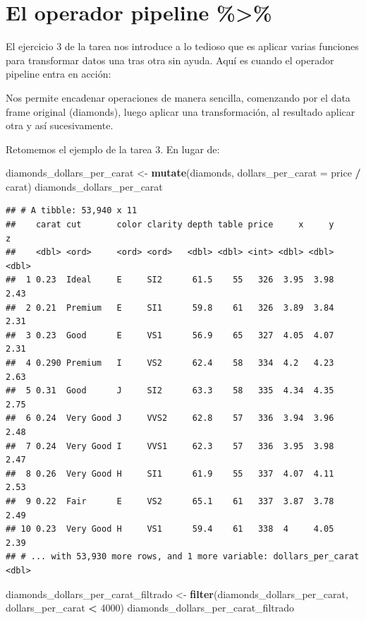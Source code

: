 \documentclass[]{book}
\newenvironment{Shaded}{\begin{snugshade}}{\end{snugshade}}
\newcommand{\KeywordTok}[1]{\textcolor[rgb]{0.13,0.29,0.53}{\textbf{#1}}}
\newcommand{\DataTypeTok}[1]{\textcolor[rgb]{0.13,0.29,0.53}{#1}}
\newcommand{\DecValTok}[1]{\textcolor[rgb]{0.00,0.00,0.81}{#1}}
\newcommand{\StringTok}[1]{\textcolor[rgb]{0.31,0.60,0.02}{#1}}
\newcommand{\OperatorTok}[1]{\textcolor[rgb]{0.81,0.36,0.00}{\textbf{#1}}}
\newcommand{\NormalTok}[1]{#1}
\theoremstyle{definition}
\theoremstyle{definition}
\theoremstyle{definition}
\theoremstyle{remark}
\begin{document}
\section{El operador pipeline
\%\textgreater{}\%}\label{el-operador-pipeline}

El ejercicio 3 de la tarea nos introduce a lo tedioso que es aplicar
varias funciones para transformar datos una tras otra sin ayuda. Aquí es
cuando el operador pipeline entra en acción:

Nos permite encadenar operaciones de manera sencilla, comenzando por el
data frame original (diamonds), luego aplicar una transformación, al
resultado aplicar otra y así sucesivamente.

Retomemos el ejemplo de la tarea 3. En lugar de:

\begin{Shaded}
\begin{Highlighting}[]
\NormalTok{diamonds_dollars_per_carat <-}\StringTok{ }\KeywordTok{mutate}\NormalTok{(diamonds, }\DataTypeTok{dollars_per_carat =}\NormalTok{ price }\OperatorTok{/}\StringTok{ }\NormalTok{carat)}
\NormalTok{diamonds_dollars_per_carat}
\end{Highlighting}
\end{Shaded}

\begin{verbatim}
## # A tibble: 53,940 x 11
##    carat cut       color clarity depth table price     x     y     z
##    <dbl> <ord>     <ord> <ord>   <dbl> <dbl> <int> <dbl> <dbl> <dbl>
##  1 0.23  Ideal     E     SI2      61.5    55   326  3.95  3.98  2.43
##  2 0.21  Premium   E     SI1      59.8    61   326  3.89  3.84  2.31
##  3 0.23  Good      E     VS1      56.9    65   327  4.05  4.07  2.31
##  4 0.290 Premium   I     VS2      62.4    58   334  4.2   4.23  2.63
##  5 0.31  Good      J     SI2      63.3    58   335  4.34  4.35  2.75
##  6 0.24  Very Good J     VVS2     62.8    57   336  3.94  3.96  2.48
##  7 0.24  Very Good I     VVS1     62.3    57   336  3.95  3.98  2.47
##  8 0.26  Very Good H     SI1      61.9    55   337  4.07  4.11  2.53
##  9 0.22  Fair      E     VS2      65.1    61   337  3.87  3.78  2.49
## 10 0.23  Very Good H     VS1      59.4    61   338  4     4.05  2.39
## # ... with 53,930 more rows, and 1 more variable: dollars_per_carat <dbl>
\end{verbatim}

\begin{Shaded}
\begin{Highlighting}[]
\NormalTok{diamonds_dollars_per_carat_filtrado <-}\StringTok{ }\KeywordTok{filter}\NormalTok{(diamonds_dollars_per_carat, dollars_per_carat }\OperatorTok{<}\StringTok{ }\DecValTok{4000}\NormalTok{)}
\NormalTok{diamonds_dollars_per_carat_filtrado}
\end{Highlighting}
\end{Shaded}
\end{document}
